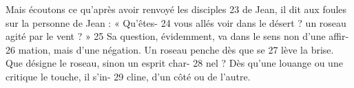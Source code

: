 Mais écoutons ce qu'après avoir renvoyé les disciples	 
23	 	de Jean, il dit aux foules sur la personne de Jean : « Qu'êtes-	 
24	 	vous allés voir dans le désert ? un roseau agité par le vent ? »	 
25	 	Sa question, évidemment, va dans le sens non d'une affir-	 
26	 	mation, mais d'une négation. Un roseau penche dès que se	 
27	 	lève la brise. Que désigne le roseau, sinon un esprit char-	 
28	 	nel ? Dès qu'une louange ou une critique le touche, il s'in-	 
29	 	cline, d'un côté ou de l'autre.